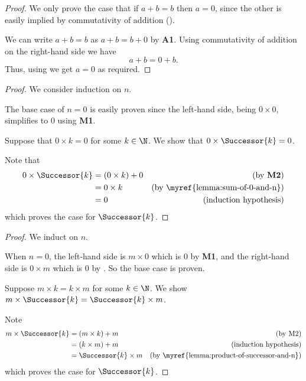\begin{questions}
    \item \begin{proof}
        We only prove the case that if $a + b = b$ then $a = 0$, since the other is easily implied by commutativity of addition ().
    
        We can write $a + b = b$ as $a + b = b + 0$ by \textbf{A1}. Using commutativity of addition on the right-hand side we have
        \[
            a + b = 0 + b.
        \]
        Thus, using  we get $a = 0$ as required.
    \end{proof}

    \item \begin{partquestions}{\roman*}
        \item \begin{proof}
            We consider induction on $n$.

            The base case of $n = 0$ is easily proven since the left-hand side, being $0 \times 0$, simplifies to 0 using \textbf{M1}.

            Suppose that $0 \times k = 0$ for some $k \in \N$. We show that $0 \times \Successor{k} = 0$.

            Note that
            \begin{align*}
                0 \times \Successor{k} &= (0 \times k) + 0 & (\text{by \textbf{M2}})\\
                &= 0 \times k & (\text{by \myref{lemma:sum-of-0-and-n}})\\
                &= 0 & (\text{induction hypothesis})
            \end{align*}
            which proves the case for $\Successor{k}$.
        \end{proof}

        \item \begin{proof}
            We induct on $n$.

            When $n = 0$, the left-hand side is $m \times 0$ which is 0 by \textbf{M1}, and the right-hand side is $0 \times m$ which is 0 by . So the base case is proven.

            Suppose $m \times k = k \times m$ for some $k \in \N$. We show $m \times \Successor{k} = \Successor{k} \times m$.

            Note
            \begin{align*}
                m \times \Successor{k} &= (m \times k) + m & (\text{by \text{M2}})\\
                &= (k \times m) + m & (\text{induction hypothesis})\\
                &= \Successor{k} \times m & (\text{by \myref{lemma:product-of-successor-and-n}})
            \end{align*}
            which proves the case for $\Successor{k}$.
        \end{proof}
    \end{partquestions}


\end{questions}
